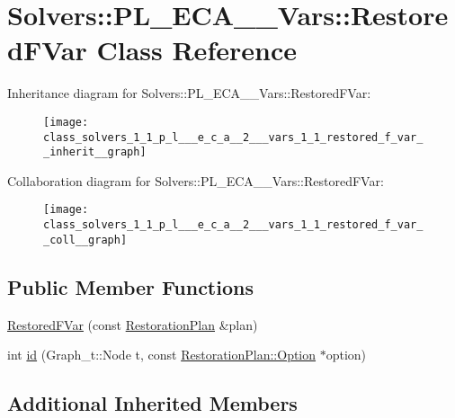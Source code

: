 \hypertarget{class_solvers_1_1_p_l___e_c_a__2___vars_1_1_restored_f_var}{}\section{Solvers\+:\+:P\+L\+\_\+\+E\+C\+A\+\_\+\_\+\+Vars\+:\+:Restored\+F\+Var Class Reference}
\label{class_solvers_1_1_p_l___e_c_a__2___vars_1_1_restored_f_var}


Inheritance diagram for Solvers\+:\+:P\+L\+\_\+\+E\+C\+A\+\_\+\_\+\+Vars\+:\+:Restored\+F\+Var\+:\nopagebreak
\begin{figure}[H]
\begin{center}
\leavevmode
\texttt{[image: class\_solvers\_1\_1\_p\_l\_\_\_e\_c\_a\_\_2\_\_\_vars\_1\_1\_restored\_f\_var\_\_inherit\_\_graph]}
\end{center}
\end{figure}


Collaboration diagram for Solvers\+:\+:P\+L\+\_\+\+E\+C\+A\+\_\+\_\+\+Vars\+:\+:Restored\+F\+Var\+:\nopagebreak
\begin{figure}[H]
\begin{center}
\leavevmode
\texttt{[image: class\_solvers\_1\_1\_p\_l\_\_\_e\_c\_a\_\_2\_\_\_vars\_1\_1\_restored\_f\_var\_\_coll\_\_graph]}
\end{center}
\end{figure}
\subsection*{Public Member Functions}
\begin{DoxyCompactItemize}
\item 
\hyperlink{class_solvers_1_1_p_l___e_c_a__2___vars_1_1_restored_f_var_a1b2057a7d94477eb0f782cab5071de7c}{Restored\+F\+Var} (const \hyperlink{class_restoration_plan}{Restoration\+Plan} \&plan)
\item 
int \hyperlink{class_solvers_1_1_p_l___e_c_a__2___vars_1_1_restored_f_var_a90719c3bd2b7d3bdbafd8c3f01a4b598}{id} (Graph\+\_\+t\+::\+Node t, const \hyperlink{class_restoration_plan_1_1_option}{Restoration\+Plan\+::\+Option} $\ast$option)
\end{DoxyCompactItemize}
\subsection*{Additional Inherited Members}


